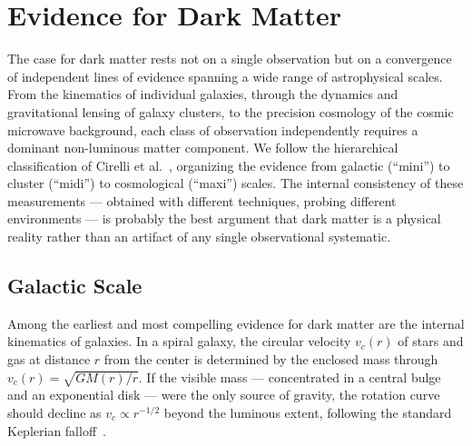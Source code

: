 
\section{Evidence for Dark Matter}
\label{sec:1.1}
The case for dark matter rests not on a single observation but on a convergence of independent lines of evidence spanning a wide range of astrophysical scales.
From the kinematics of individual galaxies, through the dynamics and gravitational lensing of galaxy clusters, to the precision cosmology of the cosmic microwave background, each class of observation independently requires a dominant non-luminous matter component.
We follow the hierarchical classification of Cirelli et al.~\cite{Cirelli:2024ssz}, organizing the evidence from galactic (``mini'') to cluster (``midi'') to cosmological (``maxi'') scales.
The internal consistency of these measurements --- obtained with different techniques, probing different environments --- is probably the best argument that dark matter is a physical reality rather than an artifact of any single observational systematic.

\subsection{Galactic Scale}
\label{sec:1.1.1}

Among the earliest and most compelling evidence for dark matter are the internal kinematics of galaxies.
In a spiral galaxy, the circular velocity $v_c(r)$ of stars and gas at distance $r$ from the center is determined by the enclosed mass through $v_c(r) = \sqrt{GM(r)/r}$.
If the visible mass --- concentrated in a central bulge and an exponential disk --- were the only source of gravity, the rotation curve should decline as $v_c \propto r^{-1/2}$ beyond the luminous extent, following the standard Keplerian falloff~\cite{Cirelli:2024ssz}.

